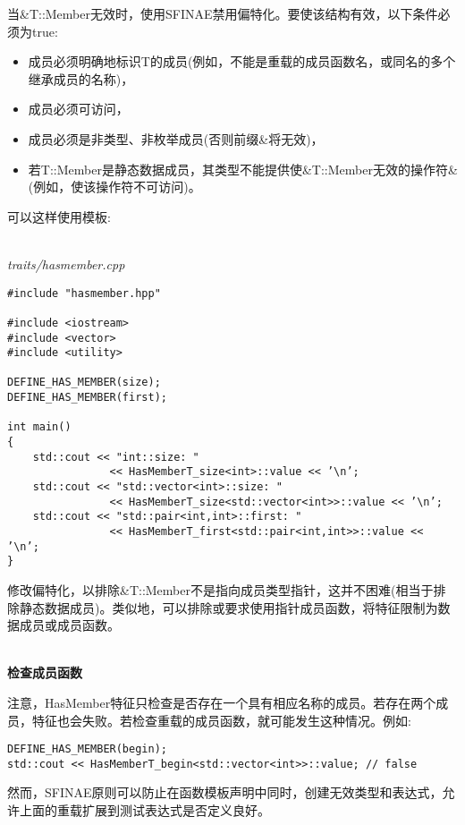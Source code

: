 当\&T::Member无效时，使用SFINAE禁用偏特化。要使该结构有效，以下条件必须为true:

\begin{itemize}
\item
成员必须明确地标识T的成员(例如，不能是重载的成员函数名，或同名的多个继承成员的名称)，

\item
成员必须可访问，

\item
成员必须是非类型、非枚举成员(否则前缀\&将无效)，

\item
若T::Member是静态数据成员，其类型不能提供使\&T::Member无效的操作符\&(例如，使该操作符不可访问)。
\end{itemize}

可以这样使用模板:

\hspace*{\fill} \\ %
\noindent
\textit{traits/hasmember.cpp}
\begin{lstlisting}[style=styleCXX]
#include "hasmember.hpp"

#include <iostream>
#include <vector>
#include <utility>

DEFINE_HAS_MEMBER(size);
DEFINE_HAS_MEMBER(first);

int main()
{
	std::cout << "int::size: "
				<< HasMemberT_size<int>::value << ’\n’;
	std::cout << "std::vector<int>::size: "
				<< HasMemberT_size<std::vector<int>>::value << ’\n’;
	std::cout << "std::pair<int,int>::first: "
				<< HasMemberT_first<std::pair<int,int>>::value << ’\n’;
}
\end{lstlisting}

修改偏特化，以排除\&T::Member不是指向成员类型指针，这并不困难(相当于排除静态数据成员)。类似地，可以排除或要求使用指针成员函数，将特征限制为数据成员或成员函数。

\hspace*{\fill} \\ %
\noindent
\textbf{检查成员函数}

注意，HasMember特征只检查是否存在一个具有相应名称的成员。若存在两个成员，特征也会失败。若检查重载的成员函数，就可能发生这种情况。例如:

\begin{lstlisting}[style=styleCXX]
DEFINE_HAS_MEMBER(begin);
std::cout << HasMemberT_begin<std::vector<int>>::value; // false
\end{lstlisting}

然而，SFINAE原则可以防止在函数模板声明中同时，创建无效类型和表达式，允许上面的重载扩展到测试表达式是否定义良好。

